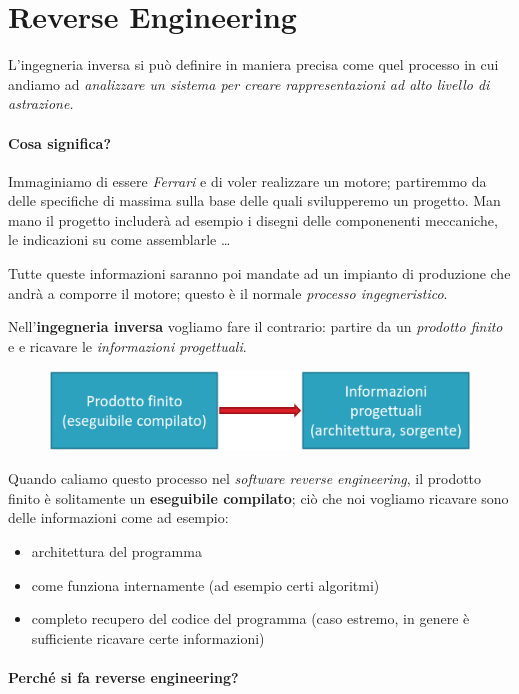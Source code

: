 \chapter{Reverse Engineering}

L'ingegneria inversa si può definire in maniera precisa come quel processo 
in cui andiamo ad \textit{analizzare un sistema per creare rappresentazioni
ad alto livello di astrazione.}

\subsubsection{Cosa significa?}

Immaginiamo di essere \textit{Ferrari} e di voler realizzare un motore; partiremmo da
delle specifiche di massima sulla base delle quali svilupperemo un progetto.
Man mano il progetto includerà ad esempio i disegni delle componenenti meccaniche, 
le indicazioni su come assemblarle \dots

Tutte queste informazioni saranno poi mandate ad un impianto di produzione che 
andrà a comporre il motore; questo è il normale \textit{processo ingegneristico}.

Nell'\textbf{ingegneria inversa} vogliamo fare il contrario: partire da un \textit{prodotto finito} e 
e ricavare le \textit{informazioni progettuali}.

\begin{figure}[ht]
    \centering
    \includegraphics[width=0.75\linewidth]{images/reverse.png}
\end{figure}

Quando caliamo questo processo nel \textit{software reverse engineering}, il prodotto
finito è solitamente un \textbf{eseguibile compilato}; ciò che noi vogliamo ricavare sono delle
informazioni come ad esempio:
\begin{itemize}
    \item architettura del programma
    \item come funziona internamente (ad esempio certi algoritmi)
    \item completo recupero del codice del programma (caso estremo, in genere è sufficiente ricavare certe informazioni)
\end{itemize}

\subsubsection{Perché si fa reverse engineering?}

